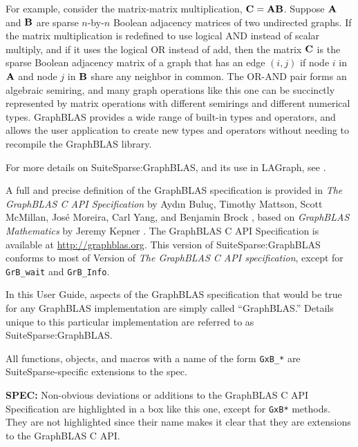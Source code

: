 \documentclass[12pt]{article}
\begin{document}
For example, consider the matrix-matrix multiplication, ${\bf C=AB}$.  Suppose
${\bf A}$ and ${\bf B}$ are sparse $n$-by-$n$ Boolean adjacency matrices of two
undirected graphs.  If the matrix multiplication is redefined to use logical
AND instead of scalar multiply, and if it uses the logical OR instead of add,
then the matrix ${\bf C}$ is the sparse Boolean adjacency matrix of a graph
that has an edge $(i,j)$ if node $i$ in ${\bf A}$ and node $j$ in ${\bf B}$
share any neighbor in common.  The OR-AND pair forms an algebraic semiring, and
many graph operations like this one can be succinctly represented by matrix
operations with different semirings and different numerical types.  GraphBLAS
provides a wide range of built-in types and operators, and allows the user
application to create new types and operators without needing to recompile the
GraphBLAS library.

For more details on SuiteSparse:GraphBLAS, and its use in LAGraph, see
\cite{Davis19,Davis21,Davis18b,DavisAznavehKolodziej19,Davis20,Mattson19}.

A full and precise definition of the GraphBLAS specification is provided in
{\em The GraphBLAS C API Specification} by {Ayd\i n Bulu\c{c}, Timothy Mattson,
Scott McMillan, Jos\'e Moreira, Carl Yang, and Benjamin Brock}
\cite{BulucMattsonMcMillanMoreiraYang17,spec}, based on {\em GraphBLAS
Mathematics} by Jeremy Kepner \cite{Kepner2017}.  The GraphBLAS C API
Specification is available at \url{http://graphblas.org}.  This version of
SuiteSparse:GraphBLAS conforms to most of Version  of
{\em The GraphBLAS C API specification}, except for \verb'GrB_wait' and \verb'GrB_Info'.

In this User Guide, aspects of the GraphBLAS specification that would be true
for any GraphBLAS implementation are simply called ``GraphBLAS.'' Details
unique to this particular implementation are referred to as
SuiteSparse:GraphBLAS.

All functions, objects, and macros with a name of the form \verb'GxB_*' are
SuiteSparse-specific extensions to the spec.

\begin{alert}
{\bf SPEC:} Non-obvious deviations or additions to the GraphBLAS C API
Specification are highlighted in a box like this one, except for \verb'GxB*'
methods.  They are not highlighted since their name makes it clear that they
are extensions to the GraphBLAS C API.
\end{alert}
\end{document}
